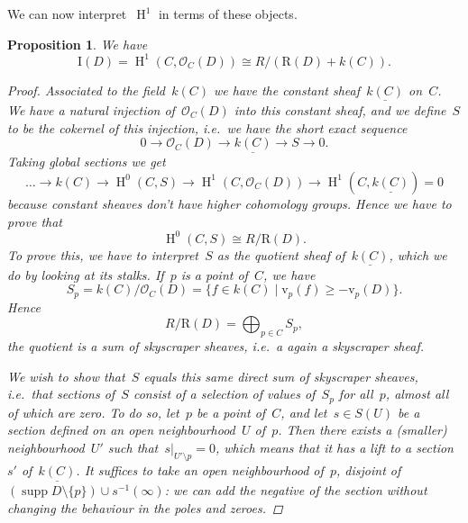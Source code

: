 \documentclass[10pt,a4paper]{article}
\theoremstyle{lecture}
\newtheorem{proposition}[theorem]{Proposition}
\DeclareMathOperator\HH{H}
\DeclareMathOperator\supp{supp}
\begin{document}
We can now interpret~$\HH^1$ in terms of these objects.
\begin{proposition}
  \label{proposition:HH1}
  We have
  \begin{equation}
    \mathrm{I}(D)=\HH^1(C,\mathcal{O}_C(D))\cong R/(\mathrm{R}(D)+k(C)).
  \end{equation}

  \begin{proof}
    Associated to the field~$k(C)$ we have the constant sheaf~$\underline{k(C)}$ on~$C$. We have a natural injection of~$\mathcal{O}_C(D)$ into this constant sheaf, and we define~$S$ to be the cokernel of this injection, i.e.\ we have the short exact sequence
    \begin{equation}
      0\to\mathcal{O}_C(D)\to\underline{k(C)}\to S\to 0.
    \end{equation}
    Taking global sections we get
    \begin{equation}
      \dotso\to k(C)\to\HH^0(C,S)\to\HH^1(C,\mathcal{O}_C(D))\to\HH^1(C,\underline{k(C)})=0
    \end{equation}
    because constant sheaves don't have higher cohomology groups. Hence we have to prove that
    \begin{equation}
      \HH^0(C,S)\cong R/\mathrm{R}(D).
    \end{equation}
    To prove this, we have to interpret~$S$ as the quotient sheaf of~$\underline{k(C)}$, which we do by looking at its stalks. If~$p$ is a point of~$C$, we have
    \begin{equation}
      S_p=k(C)/\mathcal{O}_C(D)=\{f\in k(C)\mid \mathrm{v}_p(f)\geq -\mathrm{v}_p(D)\}.
    \end{equation}
    Hence
    \begin{equation}
      R/\mathrm{R}(D)=\bigoplus_{p\in C}S_p,
    \end{equation}
    the quotient is a sum of skyscraper sheaves, i.e.\ a again a skyscraper sheaf.

    We wish to show that~$S$ equals this same direct sum of skyscraper sheaves, i.e.\ that sections of~$S$ consist of a selection of values of~$S_p$ for all~$p$, almost all of which are zero. To do so, let~$p$ be a point of~$C$, and let~$s\in S(U)$ be a section defined on an open neighbourhood~$U$ of~$p$. Then there exists a (smaller) neighbourhood~$U'$ such that~$s|_{U'\setminus p}=0$, which means that it has a lift to a section~$s'$ of~$\underline{k(C)}$. It suffices to take an open neighbourhood of~$p$, disjoint of~$(\supp D\setminus\{p\})\cup s^{-1}(\infty)$: we can add the negative of the section without changing the behaviour in the poles and zeroes.
  \end{proof}
\end{proposition}
\end{document}
